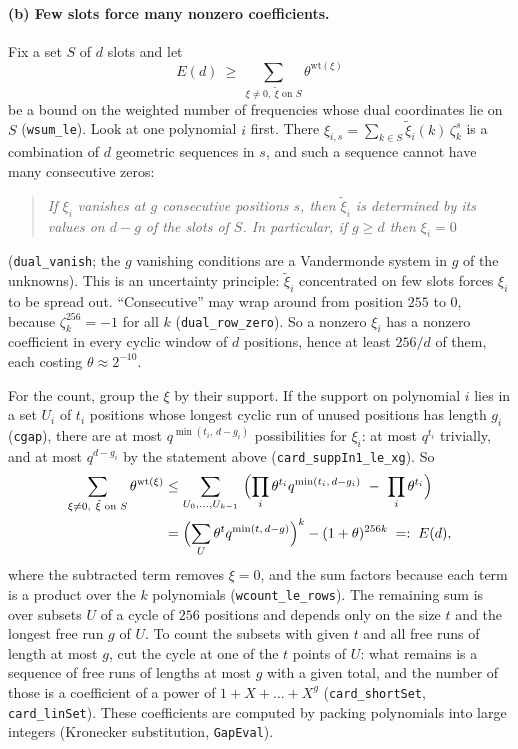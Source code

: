 \documentclass[11pt]{article}
\theoremstyle{definition}
\theoremstyle{remark}
\newcommand{\lean}[1]{\texttt{#1}}
\begin{document}
\paragraph{(b) Few slots force many nonzero coefficients.}
Fix a set $S$ of $d$ slots and let
\[
  E(d)\ \ge\ \sum_{\xi\ne0,\ \tilde\xi \text{ on } S}\theta^{\mathrm{wt}(\xi)}
\]
be a bound on the weighted number of frequencies whose dual coordinates lie on $S$
(\lean{wsum\_le}). Look at one polynomial $i$ first. There
$\xi_{i,s} = \sum_{k\in S}\tilde\xi_i(k)\,\zeta_k^s$ is a combination of $d$ geometric sequences
in $s$, and such a sequence cannot have many consecutive zeros:
\begin{quote}
\emph{If $\xi_i$ vanishes at $g$ consecutive positions $s$, then $\tilde\xi_i$ is determined by its
values on $d-g$ of the slots of $S$. In particular, if $g\ge d$ then $\xi_i=0$}
\end{quote}
(\lean{dual\_vanish}; the $g$ vanishing conditions are a Vandermonde system in $g$ of the
unknowns). This is an uncertainty principle: $\tilde\xi_i$ concentrated on few slots forces
$\xi_i$ to be spread out. ``Consecutive'' may wrap around from position $255$ to $0$, because
$\zeta_k^{256}=-1$ for all $k$ (\lean{dual\_row\_zero}). So a nonzero $\xi_i$ has a nonzero
coefficient in every cyclic window of $d$ positions, hence at least $256/d$ of them, each costing
$\theta\approx2^{-10}$.

For the count, group the $\xi$ by their support. If the support on polynomial $i$ lies in a set
$U_i$ of $t_i$ positions whose longest cyclic run of unused positions has length $g_i$
(\lean{cgap}), there are at most $q^{\min(t_i,\,d-g_i)}$ possibilities for $\xi_i$: at most
$q^{t_i}$ trivially, and at most $q^{d-g_i}$ by the statement above
(\lean{card\_suppIn1\_le\_xg}). So
\begin{align*}
  \sum_{\xi\ne0,\ \tilde\xi \text{ on } S}\theta^{\mathrm{wt}(\xi)}
  &\le \sum_{U_0,\dots,U_{k-1}}\ \Bigl(\prod_i\theta^{t_i}q^{\min(t_i,\,d-g_i)}\ -\ \prod_i\theta^{t_i}\Bigr)\\
  &= \Bigl(\sum_{U}\theta^{t}q^{\min(t,\,d-g)}\Bigr)^{k} - (1+\theta)^{256k}
  \;=:\; E(d),
\end{align*}
where the subtracted term removes $\xi=0$, and the sum factors because each term is a product
over the $k$ polynomials (\lean{wcount\_le\_rows}). The remaining sum is over subsets $U$ of a
cycle of $256$ positions and depends only on the size $t$ and the longest free run $g$ of $U$. To
count the subsets with given $t$ and all free runs of length at most $g$, cut the cycle at one of
the $t$ points of $U$: what remains is a sequence of free runs of lengths at most $g$ with a
given total, and the number of those is a coefficient of a power of $1+X+\dots+X^g$
(\lean{card\_shortSet}, \lean{card\_linSet}). These coefficients are computed by packing polynomials into large integers (Kronecker substitution,
\lean{GapEval}).
\end{document}
